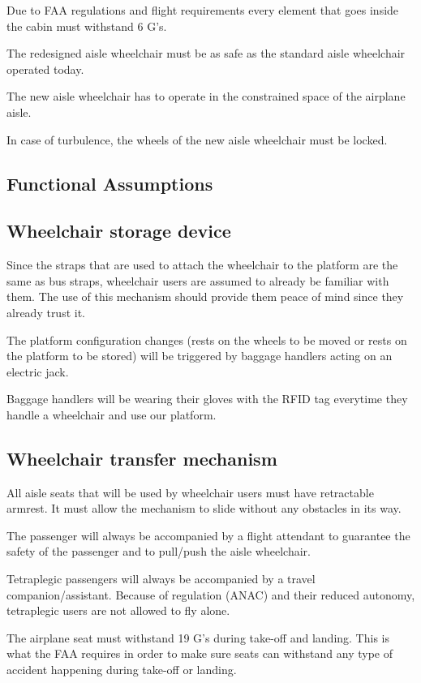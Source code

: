 \begin{list}{-}{}
  \item Due to FAA regulations and flight requirements every element that goes inside the cabin must withstand 6 G's.
  \item The redesigned aisle wheelchair must be as safe as the standard aisle wheelchair operated today.
  \item The new aisle wheelchair has to operate in the constrained space of the airplane aisle.
  \item In case of turbulence, the wheels of the new aisle wheelchair must be locked.
\end{list}

\subsection{Functional Assumptions}

\subsection*{Wheelchair storage device}

\begin{list}{-}{}
  \item Since the straps that are used to attach the wheelchair to the platform are the same as bus straps, wheelchair users are assumed to already be familiar with them. The use of this mechanism should provide them peace of mind since they already trust it. 
  \item The platform configuration changes (rests on the wheels to be moved or rests on the platform to be stored) will be triggered by baggage handlers acting on an electric jack.
  \item Baggage handlers will be wearing their gloves with the RFID tag everytime  they handle a wheelchair and use our platform.
\end{list}

\subsection*{Wheelchair transfer mechanism}

\begin{list}{-}{}
  \item All aisle seats  that will be used by wheelchair users must have retractable armrest. It must allow the mechanism to slide without any obstacles in its way.
  \item The passenger will always be accompanied by a flight attendant to guarantee the safety of the passenger and to pull/push the aisle wheelchair.
  \item Tetraplegic passengers will always be accompanied by a travel companion/assistant. Because of regulation (ANAC) and their reduced autonomy, tetraplegic users are not allowed to fly alone.
  \item The airplane seat must withstand 19 G's during take-off and landing. This is what the FAA requires in order to make sure seats can withstand any type of accident happening during take-off or landing.
\end{list}

